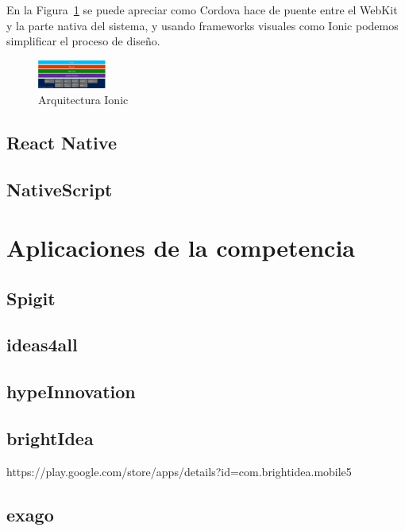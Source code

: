 En la Figura~\ref{fig:CORDOVAimg} se puede apreciar como Cordova hace de puente entre el WebKit y la parte nativa del sistema, y usando 
frameworks visuales como Ionic podemos simplificar el proceso de diseño.

\begin{figure}[!h]
	\begin{center}
		\includegraphics[width=0.2\textwidth]{./img/cordova.pdf}
		\caption{Arquitectura Ionic~\cite{CORDOVAimg}}
		\label{fig:CORDOVAimg}
	\end{center}
\end{figure}

\subsection{React Native}



\subsection{NativeScript}

\section{Aplicaciones de la competencia}
\subsection{Spigit}
\subsection{ideas4all}
\subsection{hypeInnovation}
\subsection{brightIdea}
https://play.google.com/store/apps/details?id=com.brightidea.mobile5
\subsection{exago}

